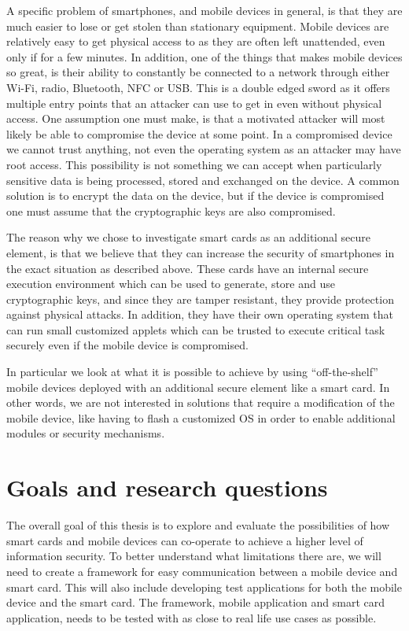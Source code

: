 A specific problem of smartphones, and mobile devices in general, is that they are much easier to lose or get stolen than stationary equipment. Mobile devices are relatively easy to get physical access to as they are often left unattended, even only if for a few minutes. In addition, one of the things that makes mobile devices so great, is their ability to constantly be connected to a network through either Wi-Fi, radio, Bluetooth, NFC or USB. This is a double edged sword as it offers multiple entry points that an attacker can use to get in even without physical access. One assumption one must make, is that a motivated attacker will most likely be able to compromise the device at some point. In a compromised device we cannot trust anything, not even the operating system as an attacker may have root access. This possibility is not something we can accept when particularly sensitive data is being processed, stored and exchanged on the device. A common solution is to encrypt the data on the device, but if the device is compromised one must assume that the cryptographic keys are also compromised.

The reason why we chose to investigate smart cards as an additional secure element, is that we believe that they can increase the security of smartphones in the exact situation as described above. These cards have an internal secure execution environment which can be used to generate, store and use cryptographic keys, and since they are tamper resistant, they provide protection against physical attacks. In addition, they have their own operating system that can run small customized applets which can be trusted to execute critical task securely even if the mobile device is compromised.

In particular we look at what it is possible to achieve by using ``off-the-shelf'' mobile devices deployed with an additional secure element like a smart card. In other words, we are not interested in solutions that require a modification of the mobile device, like having to flash a customized OS in order to enable additional modules or security mechanisms.


\section{Goals and research questions}
\label{sec:goals}
The overall goal of this thesis is to explore and evaluate the possibilities of how smart cards and mobile devices can co-operate to achieve a higher level of information security. To better understand what limitations there are, we will need to create a framework for easy communication between a mobile device and smart card. This will also include developing test applications for both the mobile device and the smart card. The framework, mobile application and smart card application, needs to be tested with as close to real life use cases as possible.

